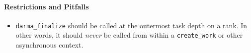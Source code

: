 \paragraph{Restrictions and Pitfalls}
\begin{itemize}
  \item \texttt{darma\_finalize} should be called at the outermost task depth on
  a rank.  In other words, it should {\it never} be called from within a
  \texttt{create\_work} or other asynchronous context.
\end{itemize}




